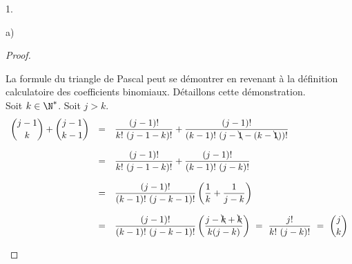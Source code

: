 \documentclass[11pt]{article}%
\begin{document}
\begin{noliste}{1.}
\begin{noliste}{a)}
    \begin{proof}~%
      \begin{remark}%
        La formule du triangle de Pascal peut se démontrer en revenant
        à la définition calculatoire des coefficients binomiaux.
        Détaillons cette démonstration.\\
        Soit $k\in\N^*$. Soit $j > k$.
        \[
        \begin{array}{rcl}
          \dbinom{j-1}{k} + \dbinom{j-1}{k-1} & = & 
          \dfrac{(j-1)!}{k! \ (j-1-k)!} + \dfrac{(j-1)!}{(k-1)! \
            (j-\bcancel{1}-(k-\bcancel{1}))!}
          \\[.6cm]
          & = & \dfrac{(j-1)!}{k! \ (j-1-k)!} + \dfrac{(j-1)!}{(k-1)! \
            (j-k)!}
          \\[.6cm]
          & = & \dfrac{(j-1)!}{(k-1)! \ (j-k-1)!} \left(
            \dfrac{1}{k} + \dfrac{1}{j-k}\right)
          \\[.6cm]
          & = & \dfrac{(j-1)!}{(k-1)! \ (j-k-1)!} \left(
            \dfrac{j-\bcancel{k}+\bcancel{k}}{k(j-k)}\right)
          \ = \ \dfrac{j!}{k! \ (j-k)!}
          \ = \ \dbinom{j}{k}
        \end{array}
        \]
      \end{remark}
	

      \newpage



\end{proof}
\end{noliste}
\end{noliste}
\end{document}
